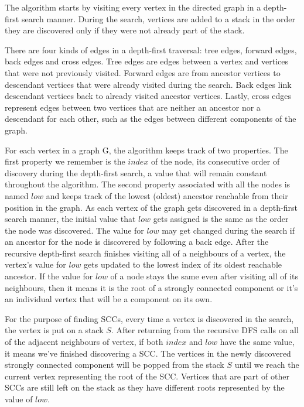\documentclass{l4proj}
\begin{document}
\noindent The algorithm starts by visiting every vertex in the directed graph in a depth-first search manner. During the search, vertices are added to a stack in the order they are discovered only if they were not already part of the stack.

\noindent There are four kinds of edges in a depth-first traversal: tree edges, forward edges, back edges and cross edges. Tree edges are edges between a vertex and vertices that were not previously visited. Forward edges are from ancestor vertices to descendant vertices that were already visited during the search. Back edges link descendant vertices back to already visited ancestor vertices. Lastly, cross edges represent edges between two vertices that are neither an ancestor nor a descendant for each other, such as the edges between different components of the graph. 

\noindent For each vertex in a graph G, the algorithm keeps track of two properties. The first property we remember is the $index$ of the node, its consecutive order of discovery during the depth-first search, a value that will remain constant throughout the algorithm. The second property associated with all the nodes is named $low$ and keeps track of the lowest (oldest) ancestor reachable from their position in the graph. As each vertex of the graph gets discovered in a depth-first search manner, the initial value that $low$ gets assigned is the same as the order the node was discovered. The value for $low$ may get changed during the search if an ancestor for the node is discovered by following a back edge. After the recursive depth-first search finishes visiting all of a neighbours of a vertex, the vertex's value for $low$ gets updated to the lowest index of its oldest reachable ancestor. If the value for $low$ of a node stays the same even after visiting all of its neighbours, then it means it is the root of a strongly connected component or it's an individual vertex that will be a component on its own.

\noindent For the purpose of finding SCCs, every time a vertex is discovered in the search, the vertex is put on a stack $S$. After returning from the recursive DFS calls on all of the adjacent neighbours of vertex, if both $index$ and $low$ have the same value, it means we've finished discovering a SCC. The vertices in the newly discovered strongly connected component will be popped from the stack $S$ until we reach the current vertex representing the root of the SCC. Vertices that are part of other SCCs are still left on the stack as they have different roots represented by the value of $low$.
\end{document}
